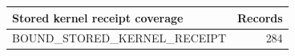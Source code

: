 \begin{tabular}{lr}
\toprule
Stored kernel receipt coverage & Records \\
\midrule
BOUND\_STORED\_KERNEL\_RECEIPT & 284 \\
\bottomrule
\end{tabular}
